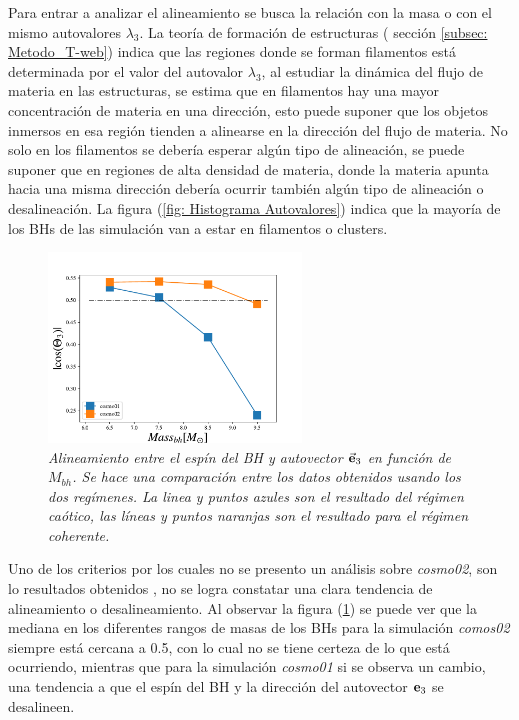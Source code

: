 Para entrar a analizar el alineamiento se busca la relación con la masa o con el mismo autovalores $\lambda_{3}$. 
La teoría de formación de estructuras ( sección \ref{subsec: Metodo_T-web}) indica que las regiones donde se forman filamentos está determinada por el valor del autovalor  $\lambda_{3}$, al estudiar la dinámica del flujo de materia en las estructuras, se estima  que en filamentos hay una mayor concentración de materia en una dirección, esto puede suponer que los objetos inmersos en esa región tienden a alinearse en la dirección del flujo de materia. No solo en los filamentos se debería esperar algún tipo de alineación, se puede suponer que en regiones de alta densidad de materia, donde la materia apunta hacia una misma dirección debería ocurrir también algún tipo de alineación o desalineación. La figura (\ref{fig: Histograma Autovalores}) indica que la mayoría de los BHs de las simulación van a estar en filamentos o clusters. 

\begin{figure}
    \centering
    \includegraphics[width=0.6\textwidth]{./figures/6_Resultados/cosmo01/relacion_simulaciones_Mass_bh.pdf}
    \caption[Alineamiento entre el espín del BH y autovector $\vec{\bf{e}}_3$ en función de $M_{bh}$]{\emph{Alineamiento entre el espín del BH y autovector $\vec{\bf{e}}_3$ en función de $M_{bh}$. Se hace una comparación entre los datos obtenidos usando los dos regímenes. La linea y puntos azules son el resultado del régimen caótico, las líneas y puntos naranjas son el resultado para el régimen coherente.}}
    \label{fig: comparacion cosmo01 y cosmo02}
\end{figure}
 
Uno de los criterios por los cuales no se presento un análisis sobre {\it{cosmo02}}, son lo resultados obtenidos 
, no se logra constatar una clara tendencia de alineamiento o desalineamiento. 
Al observar la figura (\ref{fig: comparacion cosmo01 y cosmo02}) se puede ver que la mediana en los diferentes rangos de masas de los BHs para la simulación {\it{comos02}} siempre está cercana a  0.5, con lo cual no se tiene certeza de lo que está ocurriendo, mientras que para la simulación {\it{cosmo01}} si se observa un cambio, una tendencia a que el espín del BH y la dirección del autovector ${\bf{e}}_{3}$ se desalineen.  

